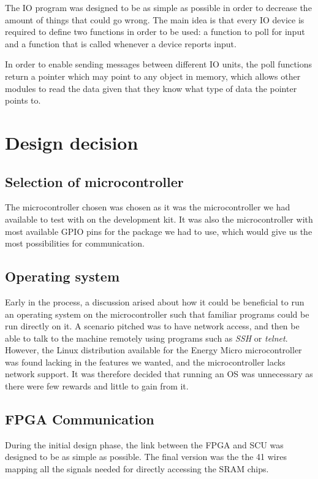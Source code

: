 The IO program was designed to be as simple as possible in order to decrease the amount of things that could go wrong.
The main idea is that every IO device is required to define two functions in order to be used: a function to poll for input and a function that is called whenever a device reports input.

In order to enable sending messages between different IO units, the poll functions return a pointer which may point to any object in memory, which allows other modules to read the data given that they know what type of data the pointer points to.

\section{Design decision}
\subsection{Selection of microcontroller}
The microcontroller chosen was chosen as it was the microcontroller we had available to test with on the development kit.
It was also the microcontroller with most available GPIO pins for the package we had to use, which would give us the most possibilities for communication.

\subsection{Operating system}
Early in the process, a discussion arised about how it could be beneficial to run an operating system on the microcontroller such that familiar programs could be run directly on it.
A scenario pitched was to have network access, and then be able to talk to the machine remotely using programs such as \textit{SSH} or \textit{telnet}.
However, the Linux distribution available for the Energy Micro microcontroller was found lacking in the features we wanted, and the microcontroller lacks network support.
It was therefore decided that running an OS was unnecessary as there were few rewards and little to gain from it.

\subsection{FPGA Communication}
During the initial design phase, the link between the FPGA and SCU was designed to be as simple as possible.
The final version was the the 41 wires mapping all the signals needed for directly accessing the SRAM chips.

